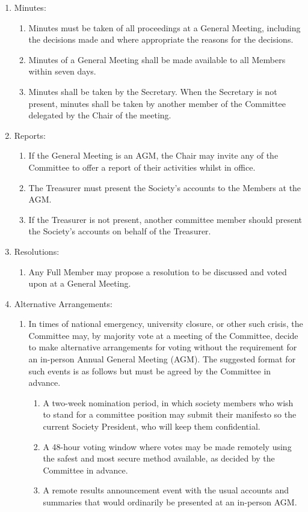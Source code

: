 \documentclass[12pt]{constitution}
\begin{document}
\begin{enumerate}
    \item Minutes:
    \begin{enumerate}
        \item Minutes must be taken of all proceedings at a General Meeting, including the decisions made and where appropriate the reasons for the decisions.
        \item Minutes of a General Meeting shall be made available to all Members within seven days.
        \item Minutes shall be taken by the Secretary. When the Secretary is not present, minutes shall be taken by another member of the Committee delegated by the Chair of the meeting.
    \end{enumerate}

    \item Reports:
    \begin{enumerate}
        \item If the General Meeting is an AGM, the Chair may invite any of the Committee to offer a report of their activities whilst in office.
        \item The Treasurer must present the Society's accounts to the Members at the AGM.
        \item If the Treasurer is not present, another committee member should present the Society's accounts on behalf of the Treasurer.
    \end{enumerate}

    \item Resolutions:
    \begin{enumerate}
        \item Any Full Member may propose a resolution to be discussed and voted upon at a General Meeting.
    \end{enumerate}
    
    \item Alternative Arrangements:
    \begin{enumerate}
        \item In times of national emergency, university closure, or other such crisis, the Committee may, by majority vote at a meeting of the Committee, decide to make alternative arrangements for voting without the requirement for an in-person Annual General Meeting (AGM). The suggested format for such events is as follows but must be agreed by the Committee in advance.
        \begin{enumerate}
            \item A two-week nomination period, in which society members who wish to stand for a committee position may submit their manifesto so the current Society President, who will keep them confidential.
            \item A 48-hour voting window where votes may be made remotely using the safest and most secure method available, as decided by the Committee in advance.
            \item A remote results announcement event with the usual accounts and summaries that would ordinarily be presented at an in-person AGM.
        \end{enumerate}
    \end{enumerate}
\end{enumerate}
\end{document}
